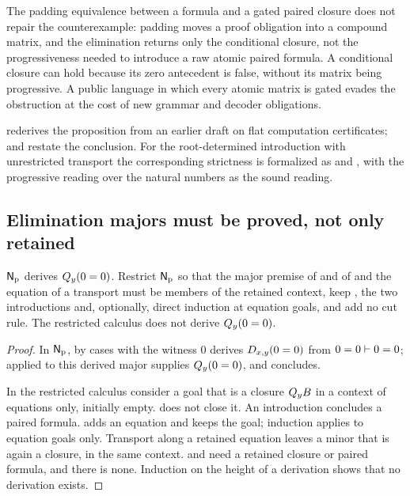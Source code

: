 The padding equivalence between a formula and a gated paired closure does not
repair the counterexample: padding moves a proof obligation into a compound
matrix, and the elimination returns only the conditional closure, not the
progressiveness needed to introduce a raw atomic paired formula. A conditional
closure can hold because its zero antecedent is false, without its matrix being
progressive. A public language in which every atomic matrix is gated evades the
obstruction at the cost of new grammar and decoder obligations.

\begin{remark}
 rederives the proposition from an earlier draft on flat
computation certificates;  and 
restate the conclusion. For the root-determined introduction with unrestricted
transport the corresponding strictness is formalized as
 and , with the
progressive reading over the natural numbers as the sound reading.
\end{remark}

\subsection{Elimination majors must be proved, not only retained}

\begin{proposition}
\label{obs:prop:majors}
$\mathsf{N}_{\mathrm{p}}$ derives $Q_{y}(0=0)$. Restrict $\mathsf{N}_{\mathrm{p}}$ so that
the major premise of  and of  and the equation of a
transport must be members of the retained context, keep , the
two introductions and, optionally, direct induction at equation goals, and add
no cut rule. The restricted calculus does not derive $Q_{y}(0=0)$.
\end{proposition}

\begin{proof}
In $\mathsf{N}_{\mathrm{p}}$,  by cases with the witness $0$ derives
$D_{x,y}(0=0)$ from $0=0\vdash 0=0$;  applied to this derived
major supplies $Q_{y}(0=0)$, and  concludes.

In the restricted calculus consider a goal that is a closure $Q_{y}B$ in a context
of equations only, initially empty.  does not close it. An
introduction concludes a paired formula.  adds an equation and
keeps the goal; induction applies to equation goals only. Transport along a
retained equation leaves a minor that is again a closure, in the same context.
 and  need a retained closure or paired formula, and
there is none. Induction on the height of a derivation shows that no derivation
exists.
\end{proof}

